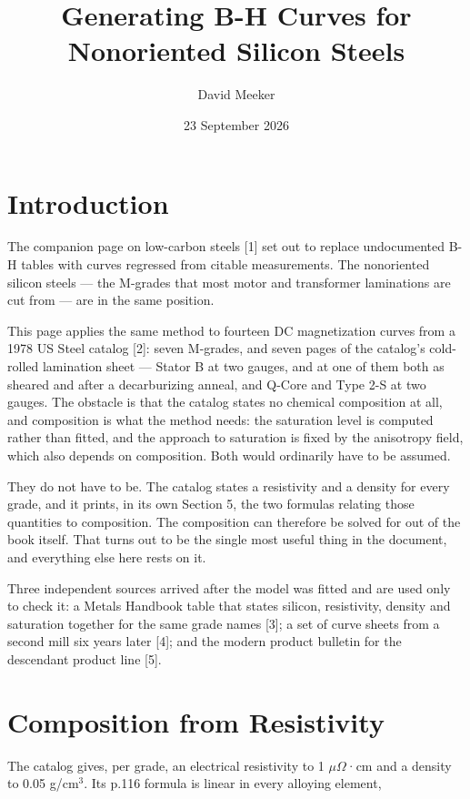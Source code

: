 \documentclass[
  11pt,
]{article}
\title{Generating B-H Curves for Nonoriented Silicon Steels}
\author{David Meeker}
\date{23 September 2026}
\begin{document}
\maketitle

\section{Introduction}\label{introduction}

The companion page on low-carbon steels {[}1{]} set out to replace undocumented B-H tables with curves regressed from citable measurements. The nonoriented silicon steels --- the M-grades that most motor and transformer laminations are cut from --- are in the same position.

This page applies the same method to fourteen DC magnetization curves from a 1978 US Steel catalog {[}2{]}: seven M-grades, and seven pages of the catalog's cold-rolled lamination sheet --- Stator B at two gauges, and at one of them both as sheared and after a decarburizing anneal, and Q-Core and Type 2-S at two gauges. The obstacle is that the catalog states no chemical composition at all, and composition is what the method needs: the saturation level is computed rather than fitted, and the approach to saturation is fixed by the anisotropy field, which also depends on composition. Both would ordinarily have to be assumed.

They do not have to be. The catalog states a resistivity and a density for every grade, and it prints, in its own Section 5, the two formulas relating those quantities to composition. The composition can therefore be solved for out of the book itself. That turns out to be the single most useful thing in the document, and everything else here rests on it.

Three independent sources arrived after the model was fitted and are used only to check it: a Metals Handbook table that states silicon, resistivity, density and saturation together for the same grade names {[}3{]}; a set of curve sheets from a second mill six years later {[}4{]}; and the modern product bulletin for the descendant product line {[}5{]}.

\section{Composition from
Resistivity}\label{composition-from-resistivity}

The catalog gives, per grade, an electrical resistivity to 1 \(\mu\Omega\)·cm and a density to 0.05 g/cm\(^{3}\). Its p.116 formula is linear in every alloying element,
\end{document}
